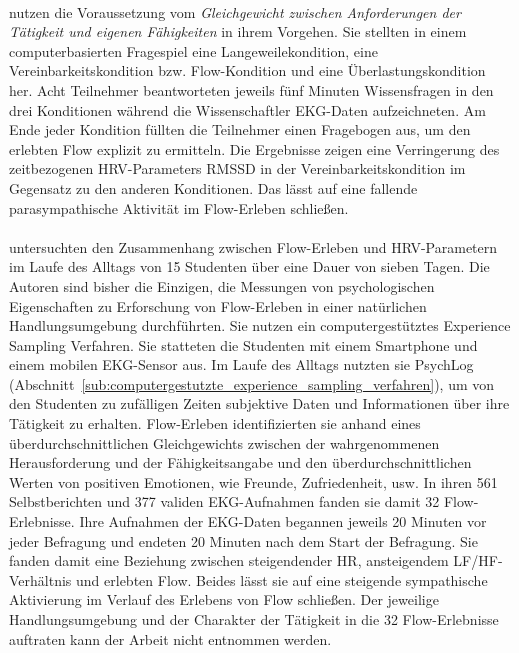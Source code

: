 \paragraph{\citet{Keller2011}} 

\label{par:keller2011}

nutzen die Voraussetzung vom \emph{Gleichgewicht zwischen Anforderungen der Tätigkeit und eigenen Fähigkeiten} in ihrem Vorgehen. Sie stellten in einem computerbasierten Fragespiel eine Langeweilekondition, eine Vereinbarkeitskondition bzw. Flow-Kondition und eine Überlastungskondition her. Acht Teilnehmer beantworteten jeweils fünf Minuten Wissensfragen in den drei Konditionen während die Wissenschaftler \ac{EKG}-Daten aufzeichneten. Am Ende jeder Kondition füllten die Teilnehmer einen Fragebogen \citep{Keller2008} aus, um den erlebten Flow explizit zu ermitteln. Die Ergebnisse zeigen eine Verringerung des zeitbezogenen \ac{HRV}-Parameters \acs{RMSSD} in der Vereinbarkeitskondition im Gegensatz zu den anderen Konditionen. Das lässt auf eine fallende parasympathische Aktivität im Flow-Erleben schließen.

\paragraph{\citet{Gaggioli2013}} 

\label{par:gaggioli2013}

untersuchten den Zusammenhang zwischen Flow-Erleben und \ac{HRV}-Parametern im Laufe des Alltags von 15 Studenten über eine Dauer von sieben Tagen. Die Autoren sind bisher die Einzigen, die Messungen von psychologischen Eigenschaften zu Erforschung von Flow-Erleben in einer natürlichen Handlungsumgebung durchführten. Sie nutzen ein computergestütztes Experience Sampling Verfahren. Sie statteten die Studenten mit einem Smartphone und einem mobilen \ac{EKG}-Sensor aus. Im Laufe des Alltags nutzten sie PsychLog (Abschnitt~\ref{sub:computergestutzte_experience_sampling_verfahren}), um von den Studenten zu zufälligen Zeiten subjektive Daten und Informationen über ihre Tätigkeit zu erhalten. Flow-Erleben identifizierten sie anhand eines überdurchschnittlichen Gleichgewichts zwischen der wahrgenommenen Herausforderung und der Fähigkeitsangabe und den überdurchschnittlichen Werten von positiven Emotionen, wie Freunde, Zufriedenheit, usw. In ihren 561 Selbstberichten und 377 validen \ac{EKG}-Aufnahmen fanden sie damit 32 Flow-Erlebnisse. Ihre Aufnahmen der \ac{EKG}-Daten begannen jeweils 20 Minuten vor jeder Befragung und endeten 20 Minuten nach dem Start der Befragung. Sie fanden damit eine Beziehung zwischen steigendender \ac{HR}, ansteigendem LF/HF-Verhältnis und erlebten Flow. Beides lässt sie auf eine steigende sympathische Aktivierung im Verlauf des Erlebens von Flow schließen. Der jeweilige Handlungsumgebung und der Charakter der Tätigkeit in die 32 Flow-Erlebnisse auftraten kann der Arbeit nicht entnommen werden. 

